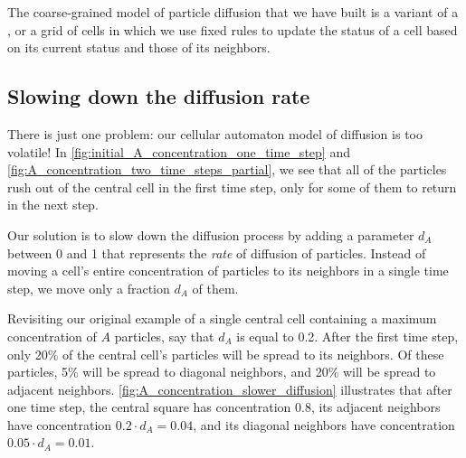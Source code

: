 \begin{qbox}\end{qbox}

The coarse-grained model of particle diffusion that we have built is a variant of a , or a grid of cells in which we use fixed rules to update the status of a cell based on its current status and those of its neighbors.\\

\begin{note}\end{note}

\FloatBarrier
{}
\subsection{Slowing down the diffusion rate}

There is just one problem: our cellular automaton model of diffusion is too volatile! In 
\autoref{fig:initial_A_concentration_one_time_step} and \autoref{fig:A_concentration_two_time_steps_partial}, we see that all of the particles rush out of the central cell in the first time step, only for some of them to return in the next step.

Our solution is to slow down the diffusion process by adding a parameter $d_A$ between 0 and 1 that represents the \textit{rate} of diffusion of  particles. Instead of moving a cell's entire concentration of particles to its neighbors in a single time step, we move only a fraction $d_A$ of them.

Revisiting our original example of a single central cell containing a maximum concentration of $A$ particles, say that $d_A$ is equal to 0.2. After the first time step, only 20\% of the central cell's particles will be spread to its neighbors. Of these particles, 5\% will be spread to diagonal neighbors, and 20\% will be spread to adjacent neighbors. \autoref{fig:A_concentration_slower_diffusion} illustrates that after one time step, the central square has concentration 0.8, its adjacent neighbors have concentration $0.2 \cdot d_A = 0.04$, and its diagonal neighbors have concentration $0.05 \cdot d_A = 0.01$.\\

